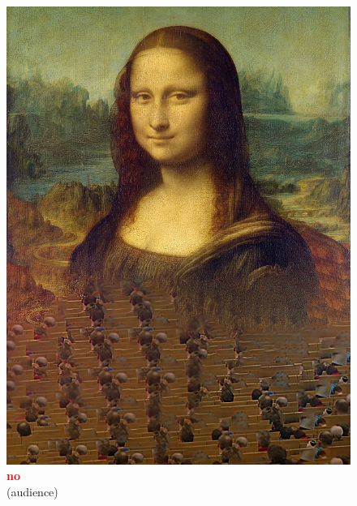 \documentclass[hyperref={pdfpagelabels=false},aspectratio=169]{beamer}
\begin{document}
\begin{frame}
\begin{columns}[T,onlytextwidth]
\begin{figure}
\includegraphics[width=1\textwidth]{audience.jpg} \\
		\textcolor{red}{\textbf{no}}	\\(audience)
	\end{figure}
\end{columns}
\end{frame}
\end{document}

